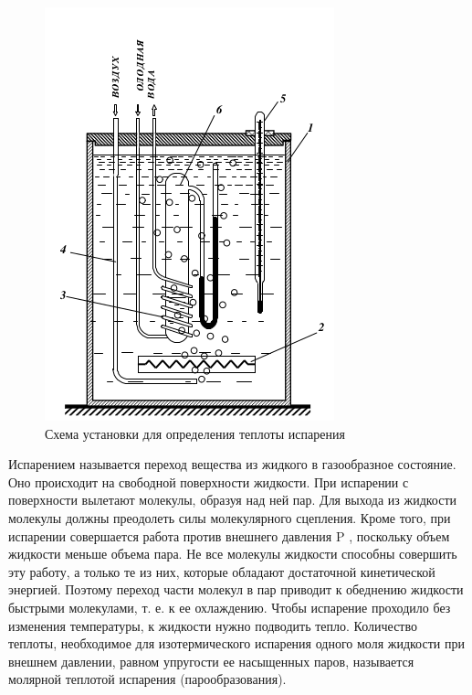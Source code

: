 \documentclass[a4paper,12pt]{article}
\begin{document}
\begin{figure}
    \includegraphics[width=1\linewidth]{ustan.png}
    \centering
    \caption{Схема установки для определения теплоты испарения}
    \label{ust}
\end{figure}
    
Испарением называется переход вещества из жидкого в газообразное состояние. Оно происходит на свободной поверхности жидкости. При испарении с поверхности вылетают молекулы, образуя над ней пар. Для выхода из жидкости молекулы должны преодолеть силы молекулярного сцепления. Кроме того, при испарении совершается работа против внешнего давления P , поскольку объем жидкости меньше объема пара. Не все молекулы жидкости способны совершить эту работу, а только те из них, которые обладают достаточной кинетической энергией. Поэтому переход части молекул в пар приводит к обеднению жидкости быстрыми молекулами, т. е. к ее охлаждению. Чтобы испарение проходило без изменения температуры, к жидкости нужно подводить тепло. Количество теплоты, необходимое для изотермического испарения одного моля жидкости при внешнем давлении, равном упругости ее насыщенных паров, называется молярной теплотой испарения (парообразования).
\end{document}
